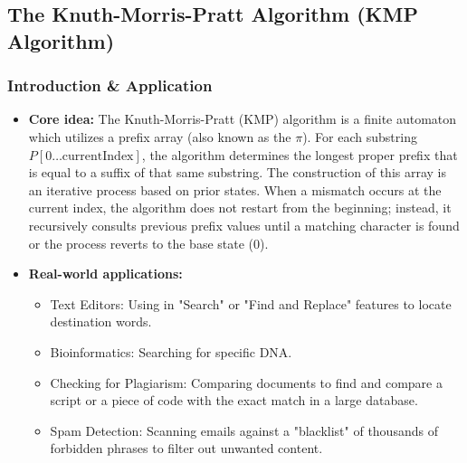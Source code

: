 \subsection[The Knuth-Morris-Pratt Algorithm]{The Knuth-Morris-Pratt Algorithm (KMP Algorithm)\cite{cpalgorithms_prefixfunction}\cite{knuth1977fast}}
    \subsubsection{Introduction \& Application} %
        \begin{itemize}%
            \item \textbf{Core idea:} %
            The Knuth-Morris-Pratt (KMP) algorithm is a finite automaton which utilizes a prefix array (also known as the $\pi$). 
            For each substring $P[0 \dots \text{currentIndex}]$, the algorithm determines the longest proper prefix that is equal to a suffix of that same substring.            
            The construction of this array is an iterative process based on prior states. 
            When a mismatch occurs at the current index, the algorithm does not restart from the beginning; instead, it recursively consults previous prefix values until a matching character is found or the process reverts to the base state (0).
            \item \textbf{Real-world applications:}
            \begin{itemize}
                \item Text Editors: Using in "Search" or "Find and Replace" features to locate destination words.
                \item Bioinformatics: Searching for specific DNA.
                \item Checking for Plagiarism: Comparing documents to find and compare a script or a piece of code with the exact match in a large database.
                \item Spam Detection: Scanning emails against a "blacklist" of thousands of forbidden phrases to filter out unwanted content.
            \end{itemize}
        \end{itemize}

